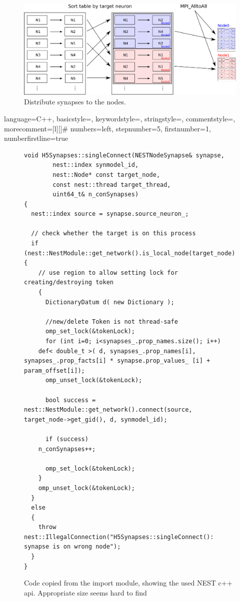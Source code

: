 \begin{figure}[ht!]
\centering
\includegraphics[scale=0.7]{pictures/sort_table_all_alltoall.eps}
\caption{Distribute synapses to the nodes.}
\end{figure}


 {language=C++,
                basicstyle=\tiny\ttfamily,
                keywordstyle=\color{blue}\ttfamily,
                stringstyle=\color{red}\ttfamily,
                commentstyle=\color{green}\ttfamily,
                morecomment=[l][\color{magenta}]{\#}
                numbers=left,
  				stepnumber=5,    
  				firstnumber=1,
 				numberfirstline=true
}
\begin{figure}[ht!]
\begin{lstlisting}[style=cppcode]
    void H5Synapses::singleConnect(NESTNodeSynapse& synapse,
    	nest::index synmodel_id,
    	nest::Node* const target_node,
    	const nest::thread target_thread,
    	uint64_t& n_conSynapses)
{
  nest::index source = synapse.source_neuron_;
  
  // check whether the target is on this process
  if (nest::NestModule::get_network().is_local_node(target_node)) {
    // use region to allow setting lock for creating/destroying token
    {     
      DictionaryDatum d( new Dictionary );
      
      //new/delete Token is not thread-safe
      omp_set_lock(&tokenLock);
      for (int i=0; i<synapses_.prop_names.size(); i++)
	def< double_t >( d, synapses_.prop_names[i], synapses_.prop_facts[i] * synapse.prop_values_ [i] + param_offset[i]);
      omp_unset_lock(&tokenLock);

      bool success = nest::NestModule::get_network().connect(source, target_node->get_gid(), d, synmodel_id);
 
      if (success)
	n_conSynapses++;
      
      omp_set_lock(&tokenLock);
    }
    omp_unset_lock(&tokenLock);
  }
  else
  {
    throw nest::IllegalConnection("H5Synapses::singleConnect(): synapse is on wrong node");
  }
}
\end{lstlisting}
\caption{Code copied from the import module, showing the used NEST c++ api. Appropriate size seems hard to find }
\end{figure}

